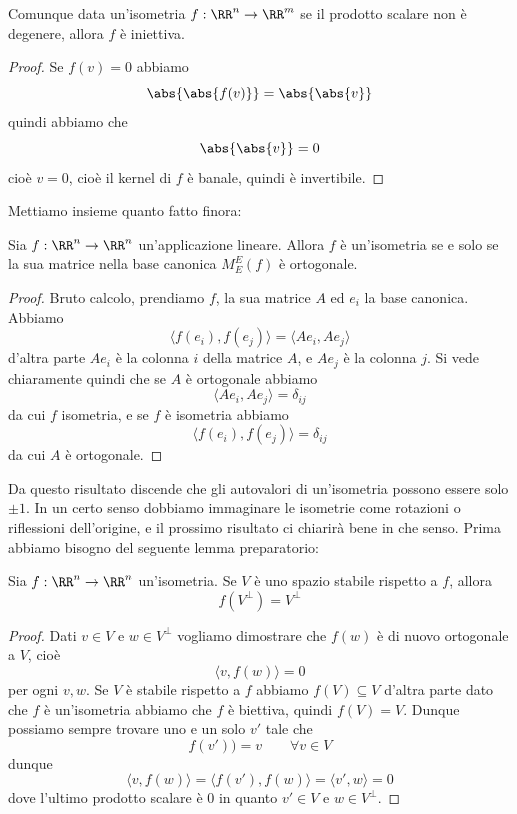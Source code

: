 \documentclass[11pt]{scrartcl}
\begin{document}
   	 \begin{lemma}
   	 	Comunque data un'isometria $f:\RR^n\to \RR^m$ se il prodotto scalare non è degenere, allora $f$ è iniettiva. 
   	 \end{lemma}
   	 \begin{proof}
   	 	Se $f(v)=0$ abbiamo
   	 	$$\abs{\abs{f(v)}}=\abs{\abs{v}}$$
   	 	quindi abbiamo che 
   	 	$$\abs{\abs{v}}=0$$
   	 	cioè $v=0$, cioè il kernel di $f$ è banale, quindi è invertibile.
   	 \end{proof}
   	 Mettiamo insieme quanto fatto finora:
   	 \begin{lemma}
   	 	Sia $f:\RR^n\to\RR^n$ un'applicazione lineare. Allora $f$ è un'isometria se e solo se la sua matrice nella base canonica $M_{E}^E(f)$ è ortogonale. 
   	 \end{lemma}
   	 \begin{proof}
   	 	Bruto calcolo, prendiamo $f$, la sua matrice $A$ ed $e_i$ la base canonica. Abbiamo
   	 	$$\langle f(e_i),f(e_j)\rangle = \langle Ae_i,Ae_j \rangle$$
   	 	d'altra parte $Ae_i$ è la colonna $i$ della matrice $A$, e $Ae_j$ è la colonna $j$. Si vede chiaramente quindi che se $A$ è ortogonale abbiamo
   	 	$$\langle Ae_i,Ae_j\rangle = \delta_{ij}$$
   	 	da cui $f$ isometria, e se $f$ è isometria abbiamo
   	 	$$\langle f(e_i),f(e_j) \rangle = \delta_{ij}$$
   	 	da cui $A$ è ortogonale.
   	 \end{proof}
   	 Da questo risultato discende che gli autovalori di un'isometria possono essere solo $\pm 1$. In un certo senso dobbiamo immaginare le isometrie come rotazioni o riflessioni dell'origine, e il prossimo risultato ci chiarirà bene in che senso. Prima abbiamo bisogno del seguente lemma preparatorio: 
   	 \begin{lemma}
   	 	Sia $f:\RR^n\to\RR^n$ un'isometria. Se $V$ è uno spazio stabile rispetto a $f$, allora 
   	 	$$f\left(V^\perp\right)=V^\perp$$
   	 \end{lemma}
   	 \begin{proof}
   	 	Dati $v\in V$ e $w\in V^\perp$ vogliamo dimostrare che $f(w)$ è di nuovo ortogonale a $V$, cioè
   	 	$$\langle v,f(w)\rangle =0$$
   	 	per ogni $v,w$. Se $V$ è stabile rispetto a $f$ abbiamo $f(V)\subseteq V$ d'altra parte dato che $f$ è un'isometria abbiamo che $f$ è biettiva, quindi $f(V)=V$. Dunque possiamo sempre trovare uno e un solo $v'$ tale che
   	 	$$f(v'))=v \qquad \forall v\in V$$
   	 	dunque 
   	 	$$\langle v,f(w)\rangle = \langle f(v'),f(w)\rangle = \langle v',w \rangle = 0$$
   	 	dove l'ultimo prodotto scalare è $0$ in quanto $v'\in V$ e $w\in V^\perp$.
   	 \end{proof}
\end{document}
